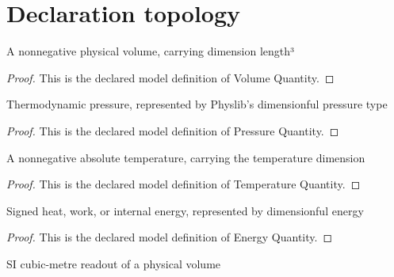 \section{Declaration topology}
\begin{definition}
  \label{def:physics:phyx-mini-0412:phyxminiproblems-problemphyxmini0412-volumequantity}
  A nonnegative physical volume, carrying dimension length³
\end{definition}
\begin{proof}
  This is the declared model definition of Volume Quantity.
\end{proof}
\begin{definition}
  \label{def:physics:phyx-mini-0412:phyxminiproblems-problemphyxmini0412-pressurequantity}
  Thermodynamic pressure, represented by Physlib's dimensionful pressure type
\end{definition}
\begin{proof}
  This is the declared model definition of Pressure Quantity.
\end{proof}
\begin{definition}
  \label{def:physics:phyx-mini-0412:phyxminiproblems-problemphyxmini0412-temperaturequantity}
  A nonnegative absolute temperature, carrying the temperature dimension
\end{definition}
\begin{proof}
  This is the declared model definition of Temperature Quantity.
\end{proof}
\begin{definition}
  \label{def:physics:phyx-mini-0412:phyxminiproblems-problemphyxmini0412-energyquantity}
  Signed heat, work, or internal energy, represented by dimensionful energy
\end{definition}
\begin{proof}
  This is the declared model definition of Energy Quantity.
\end{proof}
\begin{definition}
  \label{def:physics:phyx-mini-0412:phyxminiproblems-problemphyxmini0412-volumeincubicmeters}
  SI cubic-metre readout of a physical volume
\end{definition}
